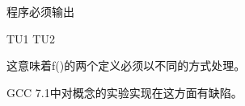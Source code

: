 程序必须输出

\begin{shell}
TU1
TU2
\end{shell}

这意味着f()的两个定义必须以不同的方式处理。

\begin{notice}
GCC 7.1中对概念的实验实现在这方面有缺陷。
\end{notice}























